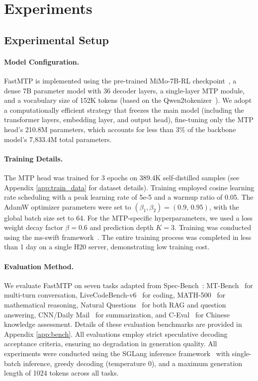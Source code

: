 \documentclass{article} %
\begin{document}
\section{Experiments}

\subsection{Experimental Setup}

\paragraph{Model Configuration.} 
FastMTP is implemented using the pre-trained MiMo-7B-RL checkpoint~\citep{xiaomi2025mimo}, a dense 7B parameter model with 36 decoder layers, a single-layer MTP module, and a vocabulary size of 152K tokens (based on the Qwen2tokenizer~\citep{yang2024qwen2}). We adopt a computationally efficient strategy that freezes the main model (including the transformer layers, embedding layer, and output head), fine-tuning only the MTP head's 210.8M parameters, which accounts for less than 3\% of the backbone model's 7,833.4M total parameters.

\paragraph{Training Details.} 
The MTP head was trained for 3 epochs on 389.4K self-distilled samples (see Appendix \ref{app:train_data} for dataset details). Training employed cosine learning rate scheduling with a peak learning rate of 5e-5 and a warmup ratio of 0.05. The AdamW optimizer parameters were set to $(\beta_1, \beta_2) = (0.9,\, 0.95)$, with the global batch size set to 64. For the MTP-specific hyperparameters, we used a loss weight decay factor $\beta = 0.6$ and prediction depth $K = 3$. Training was conducted using the ms-swift framework~\citep{zhao2025swift}. The entire training process was completed in less than 1 day on a single H20 server, demonstrating low training cost.

\paragraph{Evaluation Method.} 
We evaluate FastMTP on seven tasks adapted from Spec-Bench~\citep{xia2024unlocking}: MT-Bench~\citep{zheng2023judging} for multi-turn conversation, LiveCodeBench-v6~\citep{jain2024livecodebench} for coding, MATH-500~\citep{lightman2023lets} for mathematical reasoning, Natural Questions~\citep{kwiatkowski2019natural} for both RAG and question answering, CNN/Daily Mail~\citep{nallapati2016abstractive} for summarization, and C-Eval~\citep{huang2023ceval} for Chinese knowledge assessment. Details of these evaluation benchmarks are provided in Appendix \ref{app:bench}. All evaluations employ strict speculative decoding acceptance criteria, ensuring no degradation in generation quality. All experiments were conducted using the SGLang inference framework~\citep{zheng2024sglang} with single-batch inference, greedy decoding (temperature 0), and a maximum generation length of 1024 tokens across all tasks.
\end{document}
